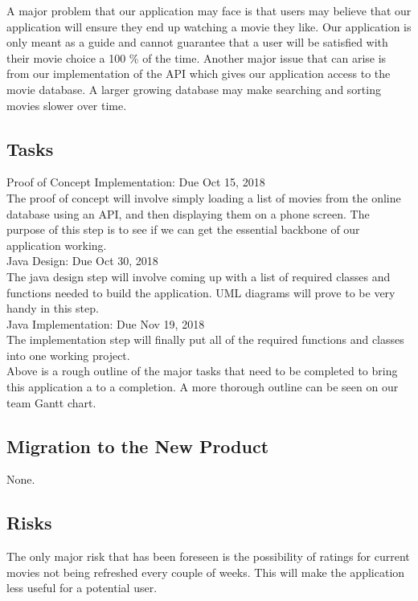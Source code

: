 \documentclass[12pt, titlepage]{article}
\begin{document}
A major problem that our application may face is that users may believe that our application will ensure they end up watching a movie they like. Our application is only meant as a guide and cannot guarantee that a user will be satisfied with their movie choice a 100 \% of the time. Another major issue that can arise is from our implementation of the API which gives our application access to the movie database. A larger growing database may make searching and sorting movies slower over time. 
\subsection{Tasks}

Proof of Concept Implementation:  Due Oct 15, 2018\\

The proof of concept will involve simply loading a list of movies from the online database using an API, and then displaying them on a phone screen. The purpose of this step is to see if we can get the essential backbone of our application working.\\

Java Design: Due Oct 30, 2018\\

The java design step will involve coming up with a list of required classes and functions needed to build the application. UML diagrams will prove to be very handy in this step.\\

Java Implementation: Due Nov 19, 2018\\

The implementation step will finally put all of the required functions and classes into one working project.\\

Above is a rough outline of the major tasks that need to be completed to bring this application a to a completion. A more thorough outline can be seen on our team Gantt chart. 

\subsection{Migration to the New Product}

None.

\subsection{Risks}

The only major risk that has been foreseen is the possibility of ratings for current movies not being refreshed every couple of weeks. This will make the application less useful for a potential user.
\end{document}
